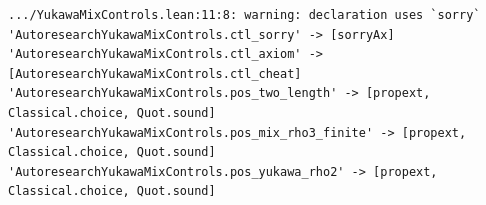 \begin{Verbatim}[fontsize=\scriptsize,frame=single,framesep=1.5mm]
.../YukawaMixControls.lean:11:8: warning: declaration uses `sorry`
'AutoresearchYukawaMixControls.ctl_sorry' -> [sorryAx]
'AutoresearchYukawaMixControls.ctl_axiom' -> [AutoresearchYukawaMixControls.ctl_cheat]
'AutoresearchYukawaMixControls.pos_two_length' -> [propext, Classical.choice, Quot.sound]
'AutoresearchYukawaMixControls.pos_mix_rho3_finite' -> [propext, Classical.choice, Quot.sound]
'AutoresearchYukawaMixControls.pos_yukawa_rho2' -> [propext, Classical.choice, Quot.sound]
\end{Verbatim}
